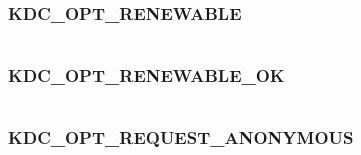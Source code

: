 \documentclass[letterpaper,10pt,english]{sphinxmanual}
\begin{document}
\subsubsection{KDC\_OPT\_RENEWABLE}
\label{appdev/refs/macros/KDC_OPT_RENEWABLE:kdc-opt-renewable}\label{appdev/refs/macros/KDC_OPT_RENEWABLE:kdc-opt-renewable-data}\label{appdev/refs/macros/KDC_OPT_RENEWABLE::doc}

\begin{fulllineitems}
\label{appdev/refs/macros/KDC_OPT_RENEWABLE:KDC_OPT_RENEWABLE}
\end{fulllineitems}


\begin{tabulary}{\linewidth}{|L|L|}
\hline

 & 
\\\hline
\end{tabulary}



\subsubsection{KDC\_OPT\_RENEWABLE\_OK}
\label{appdev/refs/macros/KDC_OPT_RENEWABLE_OK::doc}\label{appdev/refs/macros/KDC_OPT_RENEWABLE_OK:kdc-opt-renewable-ok-data}\label{appdev/refs/macros/KDC_OPT_RENEWABLE_OK:kdc-opt-renewable-ok}

\begin{fulllineitems}
\label{appdev/refs/macros/KDC_OPT_RENEWABLE_OK:KDC_OPT_RENEWABLE_OK}
\end{fulllineitems}


\begin{tabulary}{\linewidth}{|L|L|}
\hline

 & 
\\\hline
\end{tabulary}



\subsubsection{KDC\_OPT\_REQUEST\_ANONYMOUS}
\label{appdev/refs/macros/KDC_OPT_REQUEST_ANONYMOUS:kdc-opt-request-anonymous}\label{appdev/refs/macros/KDC_OPT_REQUEST_ANONYMOUS:kdc-opt-request-anonymous-data}\label{appdev/refs/macros/KDC_OPT_REQUEST_ANONYMOUS::doc}
\end{document}
